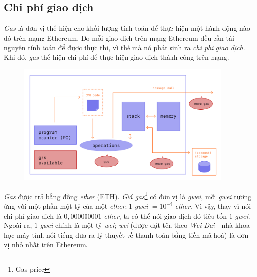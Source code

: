 \subsection{Chi phí giao dịch}

\textit{Gas} là đơn vị thể hiện cho khối lượng tính toán để thực hiện một hành động nào đó trên mạng Ethereum. Do mỗi giao dịch trên mạng Ethereum đều cần tài nguyên tính toán để được thực thi, vì thế mà nó phát sinh ra \textit{chi phí giao dịch}. Khi đó, \textit{gas} thể hiện chi phí để thực hiện giao dịch thành công trên mạng.\\

\begin{figure}[ht]
    \centering
    \includegraphics[width=400px]{images/gas.png}
\end{figure}

\textit{Gas} được trả bằng đồng \textit{ether} (ETH). \textit{Giá gas}\footnote{Gas price} có đơn vị là \textit{gwei}, mỗi \textit{gwei} tương ứng với một phần một tỷ của một \textit{ether}: $1$ \textit{gwei} $=10^{-9}$ \textit{ether}. Vì vậy, thay vì nói chi phí giao dịch là $0,000000001$ \textit{ether}, ta có thể nói giao dịch đó tiêu tốn $1$ \textit{gwei}. Ngoài ra, $1$ \textit{gwei} chính là một tỷ \textit{wei}; \textit{wei} (được đặt tên theo \textit{Wei Dai} - nhà khoa học máy tính nổi tiếng đưa ra lý thuyết về thanh toán bằng tiền mã hoá) là đơn vị nhỏ nhất trên Ethereum.\\

